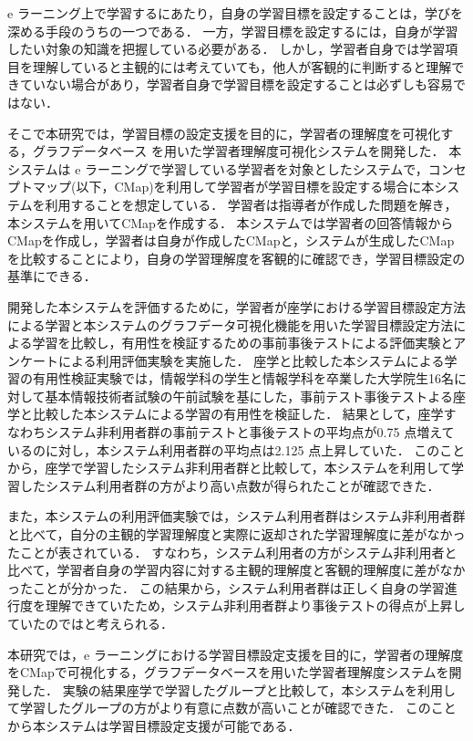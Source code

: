 e ラーニング上で学習するにあたり，自身の学習目標を設定することは，学びを深める手段のうちの一つである．
一方，学習目標を設定するには，自身が学習したい対象の知識を把握している必要がある．
しかし，学習者自身では学習項目を理解していると主観的には考えていても，他人が客観的に判断すると理解できていない場合があり，学習者自身で学習目標を設定することは必ずしも容易ではない．

そこで本研究では，学習目標の設定支援を目的に，学習者の理解度を可視化する，グラフデータベース を用いた学習者理解度可視化システムを開発した．
本システムは e ラーニングで学習している学習者を対象としたシステムで，コンセプトマップ(以下，CMap)を利用して学習者が学習目標を設定する場合に本システムを利用することを想定している．
学習者は指導者が作成した問題を解き，本システムを用いてCMapを作成する．
本システムでは学習者の回答情報からCMapを作成し，学習者は自身が作成したCMapと，システムが生成したCMapを比較することにより，自身の学習理解度を客観的に確認でき，学習目標設定の基準にできる．

開発した本システムを評価するために，学習者が座学における学習目標設定方法による学習と本システムのグラフデータ可視化機能を用いた学習目標設定方法による学習を比較し，有用性を検証するための事前事後テストによる評価実験とアンケートによる利用評価実験を実施した．
座学と比較した本システムによる学習の有用性検証実験では，情報学科の学生と情報学科を卒業した大学院生16名に対して基本情報技術者試験の午前試験を基にした，事前テスト事後テストよる座学と比較した本システムによる学習の有用性を検証した．
結果として，座学すなわちシステム非利用者群の事前テストと事後テストの平均点が0.75 点増えているのに対し，本システム利用者群の平均点は2.125 点上昇していた．
このことから，座学で学習したシステム非利用者群と比較して，本システムを利用して学習したシステム利用者群の方がより高い点数が得られたことが確認できた．

また，本システムの利用評価実験では，システム利用者群はシステム非利用者群と比べて，自分の主観的学習理解度と実際に返却された学習理解度に差がなかったことが表されている．
すなわち，システム利用者の方がシステム非利用者と比べて，学習者自身の学習内容に対する主観的理解度と客観的理解度に差がなかったことが分かった．
この結果から，システム利用者群は正しく自身の学習進行度を理解できていたため，システム非利用者群より事後テストの得点が上昇していたのではと考えられる．

本研究では，e ラーニングにおける学習目標設定支援を目的に，学習者の理解度をCMapで可視化する，グラフデータベースを用いた学習者理解度システムを開発した．
実験の結果座学で学習したグループと比較して，本システムを利用して学習したグループの方がより有意に点数が高いことが確認できた．
このことから本システムは学習目標設定支援が可能である．